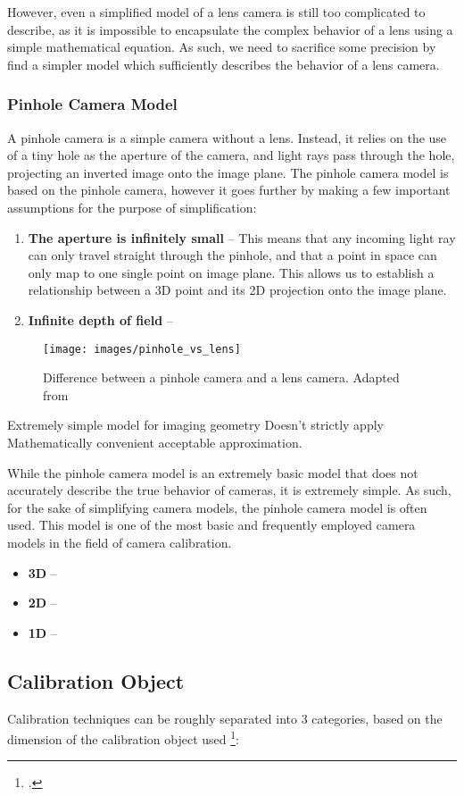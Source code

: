 However, even a simplified model of a lens camera is still too complicated to describe, as it is impossible to encapsulate the complex behavior of a lens using a simple mathematical equation. As such, we need to sacrifice some precision by find a simpler model which sufficiently describes the behavior of a lens camera. 

\subsubsection{Pinhole Camera Model}

A pinhole camera is a simple camera without a lens. Instead, it relies on the use of a tiny hole as the aperture of the camera, and light rays pass through the hole, projecting an inverted image onto the image plane. The pinhole camera model is based on the pinhole camera, however it goes further by making a few important assumptions for the purpose of simplification:

\begin{enumerate}[leftmargin=!, itemindent=-5ex]
    \item \textbf{The aperture is infinitely small} -- This means that any incoming light ray can only travel straight through the pinhole, and that a point in space can only map to one single point on image plane. This allows us to establish a relationship between a 3D point and its 2D projection onto the image plane. 
    \item \textbf{Infinite depth of field} -- 
\end{enumerate}
 

\begin{figure}
    \centering
    \texttt{[image: images/pinhole\_vs\_lens]}
    \caption{Difference between a pinhole camera and a lens camera. Adapted from \cite{leCameraModel2018}}
\end{figure}


Extremely simple model for imaging geometry
Doesn't strictly apply
Mathematically convenient acceptable approximation.


While the pinhole camera model is an extremely basic  model that does not accurately describe the true behavior of cameras, it is extremely simple. As such, for the sake of simplifying camera models, the pinhole camera model is often used. This model is one of the most basic and frequently employed camera models in the field of camera calibration. 

\begin{itemize}[leftmargin=!, itemindent=-4ex]
    \item \textbf{3D} -- 
    \item \textbf{2D} -- 
    \item \textbf{1D} -- 
\end{itemize}







\subsection{Calibration Object}

Calibration techniques can be roughly separated into 3 categories, based on the dimension of the calibration object used \footcite{zhangCameraCalibration2007}:

